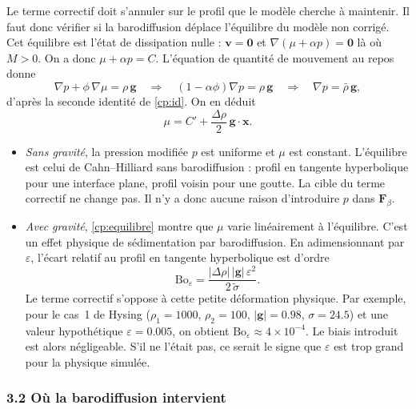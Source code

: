 Le terme correctif doit s'annuler sur le profil que le modèle cherche à maintenir. Il faut donc vérifier si la barodiffusion déplace l'équilibre du modèle non corrigé. Cet équilibre est l'état de dissipation nulle : $\mathbf{v}=\mathbf{0}$ et $\nabla\left(\mu+\alpha p\right)=\mathbf{0}$ là où $M>0$. On a donc $\mu + \alpha p = C$. L'équation de quantité de mouvement au repos donne
\begin{equation}
  \nabla p + \phi\,\nabla\mu = \rho\,\mathbf{g}
  \quad\Longrightarrow\quad
  \left(1-\alpha\phi\right)\nabla p = \rho\,\mathbf{g}
  \quad\Longrightarrow\quad
  \nabla p = \bar{\rho}\,\mathbf{g},
\end{equation}
d'après la seconde identité de \eqref{cp:id}. On en déduit
\begin{equation}\label{cp:equilibre}
  \mu = C' + \frac{\Delta\rho}{2}\,\mathbf{g}\cdot\mathbf{x}.
\end{equation}
\begin{itemize}
  \item \emph{Sans gravité}, la pression modifiée $p$ est uniforme et $\mu$ est constant. L'équilibre est celui de Cahn--Hilliard sans barodiffusion : profil en tangente hyperbolique pour une interface plane, profil voisin pour une goutte. La cible du terme correctif ne change pas. Il n'y a donc aucune raison d'introduire $p$ dans $\mathbf{F}_\beta$.
  \item \emph{Avec gravité}, \eqref{cp:equilibre} montre que $\mu$ varie linéairement à l'équilibre. C'est un effet physique de sédimentation par barodiffusion. En adimensionnant par $\varepsilon$, l'écart relatif au profil en tangente hyperbolique est d'ordre
  \begin{equation}
    \mathrm{Bo}_\varepsilon = \frac{|\Delta\rho|\,|\mathbf{g}|\,\varepsilon^{2}}{2\,\tilde{\sigma}} .
  \end{equation}
  Le terme correctif s'oppose à cette petite déformation physique. Par exemple, pour le cas~1 de Hysing ($\rho_1=1000$, $\rho_2=100$, $|\mathbf{g}|=0.98$, $\sigma=24.5$) et une valeur hypothétique $\varepsilon=0.005$, on obtient $\mathrm{Bo}_\varepsilon\approx 4\times10^{-4}$. Le biais introduit est alors négligeable. S'il ne l'était pas, ce serait le signe que $\varepsilon$ est trop grand pour la physique simulée.
\end{itemize}

\subsubsection*{3.2 Où la barodiffusion intervient}

